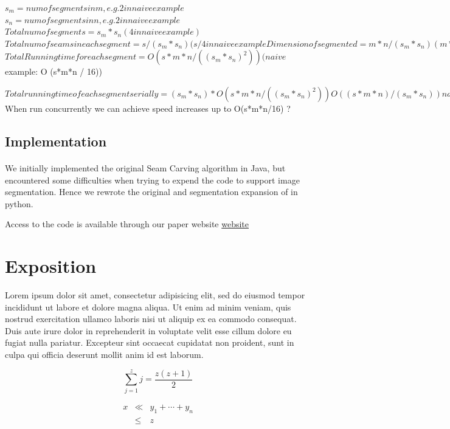 \documentclass[conference]{acmsiggraph}
\begin{document}
$s_m = num of segments in m, e.g. 2 in naive example$
$s_n = num of segments in n, e.g. 2 in naive example$
$Total num of segments = s_m*s_n (4 in naive example)$
$Total num of seams in each segment  = s/(s_m*s_n) (s/4 in naive example
Dimension of segmented =  m*n/(s_m*s_n) ( m*n / 4 in naive)$
$Total Running time for each segment = O( s*m*n / ((s_m*s_n)^2) ) (naive $ example: O (s*m*n / 16))

$Total running time of each segment serially = (s_m*s_n) * O( s*m*n / ((s_m*s_n)^2) ) 
O( (s*m*n)/(s_m*s_n) ) naive example: 4 * O (s*m*n/16) = O(s*m*n/4) - when run serially$
When run concurrently we can achieve speed increases up to O(s*m*n/16) ?



\subsection{Implementation}

\paragraph{}
We initially implemented the original Seam Carving algorithm in Java, but encountered some difficulties when trying to expend the code to support image segmentation. Hence we rewrote the original and segmentation expansion of in python. 

Access to the code is available through our paper website  \href{http://cs269uclawinter2014.wordpress.com/}{website}




\section{Exposition}

Lorem ipsum dolor sit amet, consectetur adipisicing elit, sed do
eiusmod tempor incididunt ut labore et dolore magna aliqua. Ut enim ad
minim veniam, quis nostrud exercitation ullamco laboris nisi ut
aliquip ex ea commodo consequat. Duis aute irure dolor in
reprehenderit in voluptate velit esse cillum dolore eu fugiat nulla
pariatur. Excepteur sint occaecat cupidatat non proident, sunt in
culpa qui officia deserunt mollit anim id est laborum.

\begin{equation}
 \sum_{j=1}^{z} j = \frac{z(z+1)}{2}
\end{equation}

\begin{eqnarray}
x & \ll & y_{1} + \cdots + y_{n} \\
  & \leq & z
\end{eqnarray}
\end{document}
